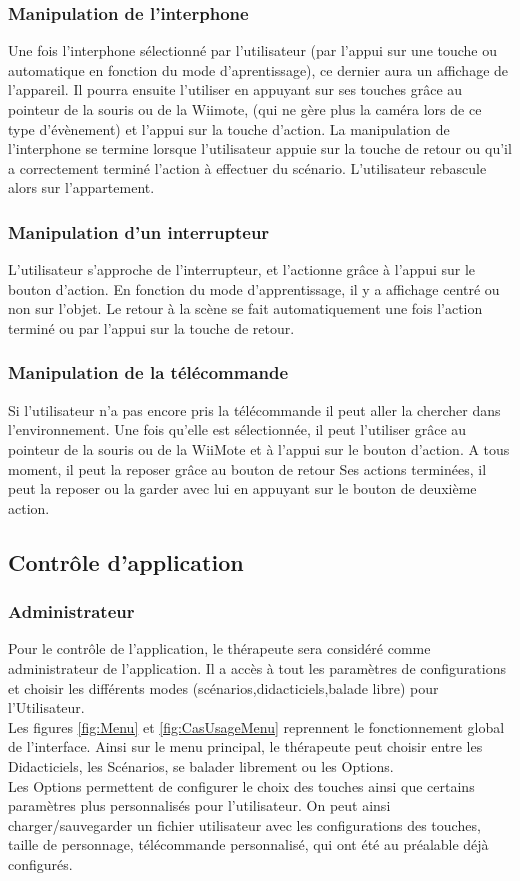 \subsubsection{Manipulation de l’interphone }
Une fois l’interphone sélectionné par l’utilisateur (par l’appui sur une touche ou automatique en fonction du mode d’aprentissage), ce dernier aura un affichage de l’appareil. Il pourra ensuite l’utiliser en appuyant sur ses touches grâce au pointeur de la souris ou de la Wiimote, (qui ne gère plus la caméra lors de ce type d’évènement) et l’appui sur la touche d’action. La manipulation de l’interphone se termine lorsque l’utilisateur appuie sur la touche de retour ou qu’il a correctement terminé l’action à effectuer du scénario. L’utilisateur rebascule alors sur l’appartement.

\subsubsection{Manipulation d’un interrupteur}
L’utilisateur s’approche de l’interrupteur, et l’actionne grâce à l’appui sur le bouton d’action. En fonction du mode d’apprentissage, il y a affichage centré ou non sur l’objet. Le retour à la scène se fait automatiquement une fois l’action terminé ou par l’appui sur la touche de retour.

\subsubsection{Manipulation de la télécommande}
Si l’utilisateur n’a pas encore pris la télécommande il peut aller la chercher dans l’environnement. Une fois qu’elle est sélectionnée, il peut l’utiliser grâce au pointeur de la souris ou de la WiiMote et à l’appui sur le bouton d’action. A tous moment, il peut la reposer grâce au bouton de retour Ses actions terminées, il peut la reposer ou la garder avec lui en appuyant sur le bouton de deuxième action. 

\subsection{Contrôle d’application}
\subsubsection{Administrateur}
Pour le contrôle de l'application, le thérapeute sera considéré comme administrateur de l'application. Il a accès à 
tout les paramètres de configurations et choisir les différents modes (scénarios,didacticiels,balade libre) pour l'Utilisateur.
\\
Les figures \ref{fig:Menu} et \ref{fig:CasUsageMenu} reprennent le fonctionnement global de l'interface. Ainsi sur le menu principal, le thérapeute peut choisir entre les Didacticiels, les Scénarios, se balader librement ou les Options.
\\
Les Options permettent de configurer le choix des touches ainsi que certains paramètres plus personnalisés pour l'utilisateur. On peut ainsi charger/sauvegarder un fichier utilisateur avec les configurations des touches, taille de personnage, télécommande personnalisé, qui ont été au préalable déjà configurés. 


